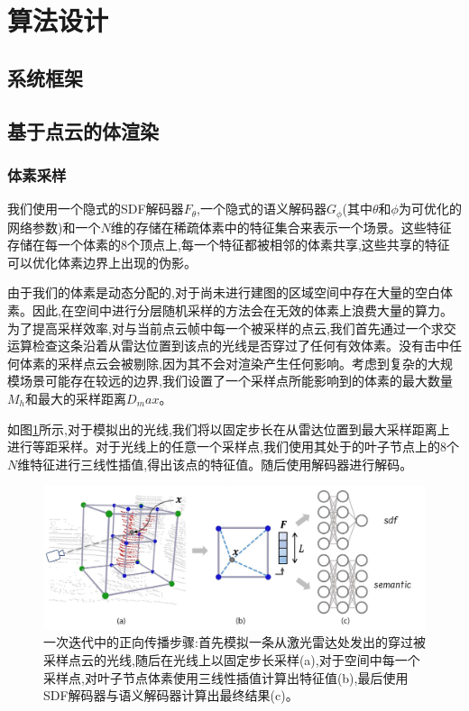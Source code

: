 \section{算法设计}\label{algorithm}

\subsection{系统框架}
\subsection{基于点云的体渲染}


\subsubsection{体素采样}
我们使用一个隐式的SDF解码器$F_\theta$,一个隐式的语义解码器$G_\phi$(其中$\theta$和$\phi$为可优化的网络参数)和一个$N$维的存储在稀疏体素中的特征集合来表示一个场景。这些特征存储在每一个体素的8个顶点上,每一个特征都被相邻的体素共享,这些共享的特征可以优化体素边界上出现的伪影。

由于我们的体素是动态分配的,对于尚未进行建图的区域空间中存在大量的空白体素。因此,在空间中进行分层随机采样的方法会在无效的体素上浪费大量的算力。为了提高采样效率,对与当前点云帧中每一个被采样的点云,我们首先通过一个求交运算检查这条沿着从雷达位置到该点的光线是否穿过了任何有效体素。没有击中任何体素的采样点云会被剔除,因为其不会对渲染产生任何影响。考虑到复杂的大规模场景可能存在较远的边界,我们设置了一个采样点所能影响到的体素的最大数量$M_h$和最大的采样距离$D_max$。

如图\ref{shinemapping}所示,对于模拟出的光线,我们将以固定步长在从雷达位置到最大采样距离上进行等距采样。对于光线上的任意一个采样点,我们使用其处于的叶子节点上的8个$N$维特征进行三线性插值,得出该点的特征值。随后使用解码器进行解码。
\begin{figure}[htbp]
    \includegraphics[scale = 0.3]{figures/shinemapping.png}
    \centering
    \caption{一次迭代中的正向传播步骤:首先模拟一条从激光雷达处发出的穿过被采样点云的光线,随后在光线上以固定步长采样(a),对于空间中每一个采样点,对叶子节点体素使用三线性插值计算出特征值(b),最后使用SDF解码器与语义解码器计算出最终结果(c)。}\label{shinemapping}
\end{figure}
